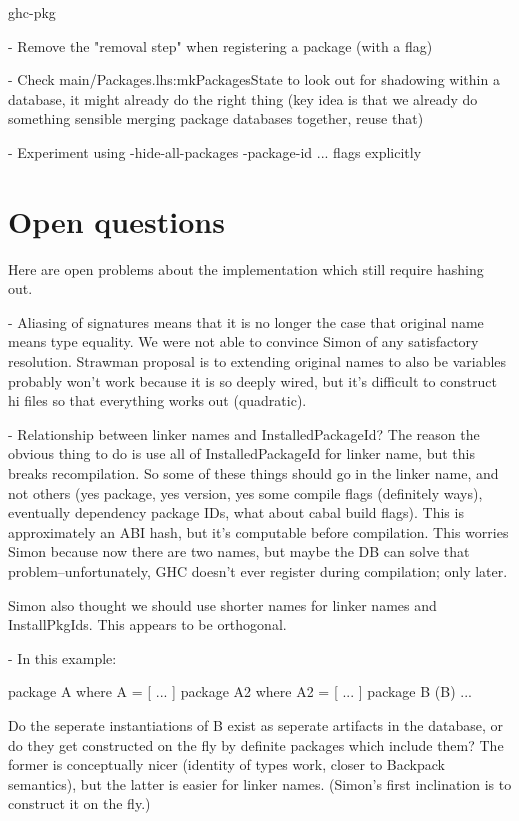 \documentclass{article}
\begin{document}
ghc-pkg

    - Remove the "removal step" when registering a package (with a flag)

    - Check main/Packages.lhs:mkPackagesState to look out for shadowing
      within a database, it might already do the right thing (key idea
      is that we already do something sensible merging package databases
      together, reuse that)

    - Experiment using -hide-all-packages -package-id ... flags explicitly

\section{Open questions}

Here are open problems about the implementation which still require
hashing out.

    - Aliasing of signatures means that it is no longer the case that
      original name means type equality.  We were not able to convince
      Simon of any satisfactory resolution.  Strawman proposal is to
      extending original names to also be variables probably won't work
      because it is so deeply wired, but it's difficult to construct hi
      files so that everything works out (quadratic).

    - Relationship between linker names and InstalledPackageId? The reason
      the obvious thing to do is use all of InstalledPackageId for linker
      name, but this breaks recompilation.  So some of these things
      should go in the linker name, and not others (yes package, yes
      version, yes some compile flags (definitely ways), eventually
      dependency package IDs, what about cabal build flags).  This is
      approximately an ABI hash, but it's computable before compilation.
      This worries Simon because now there are two names, but maybe
      the DB can solve that problem--unfortunately, GHC doesn't ever
      register during compilation; only later.

        Simon also thought we should use shorter names for linker
        names and InstallPkgIds.  This appears to be orthogonal.

    - In this example:

        package A where
            A = [ ... ]
        package A2 where
            A2 = [ ... ]
        package B (B)
            ...

      Do the seperate instantiations of B exist as seperate artifacts
      in the database, or do they get constructed on the fly by
      definite packages which include them?  The former is conceptually
      nicer (identity of types work, closer to Backpack semantics), but
      the latter is easier for linker names. (Simon's first inclination
      is to construct it on the fly.)
\end{document}
